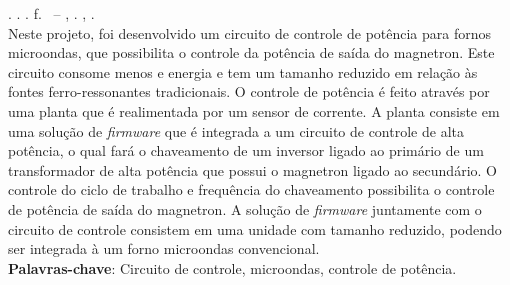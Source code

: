 
\begin{resumo}[RESUMO]
\begin{SingleSpacing}

\imprimirautorcitacao. \imprimirtitulo. \imprimirdata. \pageref {LastPage} f. \imprimirprojeto\ – \imprimirprograma, \imprimirinstituicao. \imprimirlocal, \imprimirdata.\\


Neste projeto, foi desenvolvido um circuito de controle de potência para fornos microondas, que possibilita o controle da potência de saída do magnetron. Este circuito consome menos e energia e tem um tamanho reduzido em relação às fontes ferro-ressonantes tradicionais. O controle de potência é feito através por uma planta que é realimentada por um sensor de corrente. A planta consiste em uma solução de \textit{firmware} que é integrada a um circuito de controle de alta potência, o qual fará o chaveamento de um inversor ligado ao primário de um transformador de alta potência que possui o magnetron ligado ao secundário. O controle do ciclo de trabalho e frequência do chaveamento possibilita o controle de potência de saída do magnetron. A solução de \textit{firmware} juntamente com o circuito de controle consistem em uma unidade com tamanho reduzido, podendo ser integrada à um forno microondas convencional.\\

\textbf{Palavras-chave}: Circuito de controle, microondas, controle de potência.

\end{SingleSpacing}
\end{resumo}

